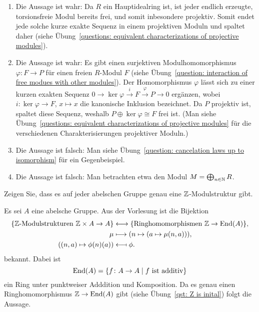\begin{solution}
\begin{enumerate}
    \item
      Die Aussage ist wahr:
      Da $R$ ein Hauptidealring ist, ist jeder endlich erzeugte, torsionsfreie Modul bereits frei, und somit inbesondere projektiv.
      Somit endet jede solche kurze exakte Sequenz in einem projektiven Moduln und spaltet daher (siehe Übung~\ref{questions: equivalent characterizations of projective modules}).
    
    \item
      Die Aussage ist wahr:
      Es gibt einen surjektiven Modulhomomorphismus $\varphi \colon F \to P$ für einen freien $R$-Modul $F$ (siehe Übung~\ref{question: interaction of free modues with other modules}).
      Der Homomorphismus $\varphi$ lässt sich zu einer kurzen exakten Sequenz $0 \to \ker \varphi \xrightarrow{i} F \xrightarrow{\varphi} P \to 0$ ergänzen, wobei $i \colon \ker \varphi \to F$, $x \mapsto x$ die kanonische Inklusion bezeichnet.
      Da $P$ projektiv ist, spaltet diese Sequenz, weshalb $P \oplus \ker \varphi \cong F$ frei ist.
      (Man siehe Übung~\ref{questions: equivalent characterizations of projective modules} für die verschiedenen Charakterisierungen projektiver Moduln.)
      
    \item
      Die Aussage ist falsch:
      Man siehe Übung~\ref{question: cancelation laws up to isomorphism} für ein Gegenbeispiel.
      
    \item
      Die Aussage ist falsch:
      Man betrachten etwa den Modul $M = \bigoplus_{n \in \mathbb{N}} R$.
  \end{enumerate}
\end{solution}


\begin{question}
  Zeigen Sie, dass es auf jeder abelschen Gruppe genau eine $\mathbb{Z}$-Modulstruktur gibt.
\end{question}


\begin{solution}
  Es sei $A$ eine abelsche Gruppe.
  Aus der Vorlesung ist die Bijektion
  \begin{align*}
    \{\text{$\mathbb{Z}$-Modulstrukturen $\mathbb{Z} \times A \to A$}\}
    &\longleftrightarrow
    \{\text{Ringhomomorphismen $\mathbb{Z} \to \operatorname{End}(A)$}\},
    \\
                    \mu
    &\longmapsto    (n \mapsto (a \mapsto \mu(n,a))),
    \\
                    ( (n,a) \mapsto \phi(n)(a) )
    &\longmapsfrom  \phi.
  \end{align*}
  bekannt.
  Dabei ist
  \[
      \operatorname{End}(A)
    = \{f \colon A \to A \mid \text{$f$ ist additiv}\}
  \]
  ein Ring unter punktweiser Adddition und Komposition.
  Da es genau einen Ringhomomorphismus $\mathbb{Z} \to \operatorname{End}(A)$ gibt (siehe Übung~\ref{qst: Z is inital}) folgt die Aussage.
\end{solution}


